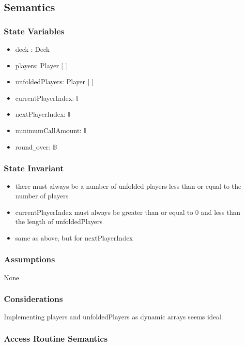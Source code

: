 \documentclass[12pt, titlepage]{article}
\begin{document}
\subsection* {Semantics}

\subsubsection* {State Variables}

\begin{itemize}
    \item deck : Deck
    \item players: Player [ ]
    \item unfoldedPlayers: Player [ ]
    \item currentPlayerIndex: $\mathbb{I}$
    \item nextPlayerIndex: $\mathbb{I}$
    \item minimumCallAmount: $\mathbb{I}$
    \item round\verb|_|over: $\mathbb{B}$
\end{itemize}

\subsubsection* {State Invariant}

\begin{itemize}
    \item there must always be a number of unfolded players less than or equal to the number of players
    \item currentPlayerIndex must always be greater than or equal to 0 and less than the length of unfoldedPlayers
    \item same as above, but for nextPlayerIndex
\end{itemize}

\subsubsection* {Assumptions}

None

\subsubsection* {Considerations}

Implementing players and unfoldedPlayers as dynamic arrays seems ideal.

\subsubsection* {Access Routine Semantics}
\end{document}
